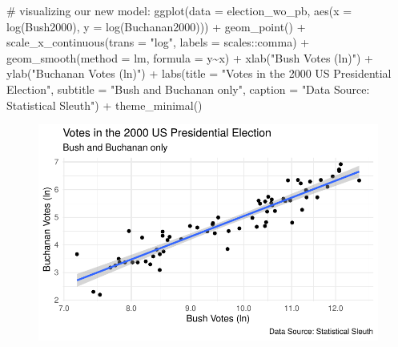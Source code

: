 \documentclass[
  letterpaper,
  DIV=11,
  numbers=noendperiod]{scrartcl}
\newenvironment{Shaded}{\begin{snugshade}}{\end{snugshade}}
\newcommand{\AttributeTok}[1]{\textcolor[rgb]{0.40,0.45,0.13}{#1}}
\newcommand{\CommentTok}[1]{\textcolor[rgb]{0.37,0.37,0.37}{#1}}
\newcommand{\FunctionTok}[1]{\textcolor[rgb]{0.28,0.35,0.67}{#1}}
\newcommand{\NormalTok}[1]{\textcolor[rgb]{0.00,0.23,0.31}{#1}}
\newcommand{\SpecialCharTok}[1]{\textcolor[rgb]{0.37,0.37,0.37}{#1}}
\newcommand{\StringTok}[1]{\textcolor[rgb]{0.13,0.47,0.30}{#1}}
\begin{document}
\begin{Shaded}
\begin{Highlighting}[]
\CommentTok{\# visualizing our new model:}
\FunctionTok{ggplot}\NormalTok{(}\AttributeTok{data =}\NormalTok{ election\_wo\_pb, }\FunctionTok{aes}\NormalTok{(}\AttributeTok{x =} \FunctionTok{log}\NormalTok{(Bush2000), }\AttributeTok{y =} \FunctionTok{log}\NormalTok{(Buchanan2000))) }\SpecialCharTok{+}
  \FunctionTok{geom\_point}\NormalTok{() }\SpecialCharTok{+}
  \FunctionTok{scale\_x\_continuous}\NormalTok{(}\AttributeTok{trans =} \StringTok{"log"}\NormalTok{, }\AttributeTok{labels =}\NormalTok{ scales}\SpecialCharTok{::}\NormalTok{comma) }\SpecialCharTok{+} 
  \FunctionTok{geom\_smooth}\NormalTok{(}\AttributeTok{method =}\NormalTok{ lm, }\AttributeTok{formula =}\NormalTok{ y}\SpecialCharTok{\textasciitilde{}}\NormalTok{x) }\SpecialCharTok{+}
  \FunctionTok{xlab}\NormalTok{(}\StringTok{"Bush Votes (ln)"}\NormalTok{) }\SpecialCharTok{+}
  \FunctionTok{ylab}\NormalTok{(}\StringTok{"Buchanan Votes (ln)"}\NormalTok{) }\SpecialCharTok{+} 
  \FunctionTok{labs}\NormalTok{(}\AttributeTok{title =} \StringTok{"Votes in the 2000 US Presidential Election"}\NormalTok{, }\AttributeTok{subtitle =} \StringTok{"Bush and Buchanan only"}\NormalTok{, }\AttributeTok{caption =} \StringTok{"Data Source: Statistical Sleuth"}\NormalTok{) }\SpecialCharTok{+}
  \FunctionTok{theme\_minimal}\NormalTok{()}
\end{Highlighting}
\end{Shaded}

\begin{figure}[H]

{\centering \includegraphics{sds-291_s-24_case-study-template_files/figure-pdf/unnamed-chunk-12-2.pdf}

}

\end{figure}
\end{document}
